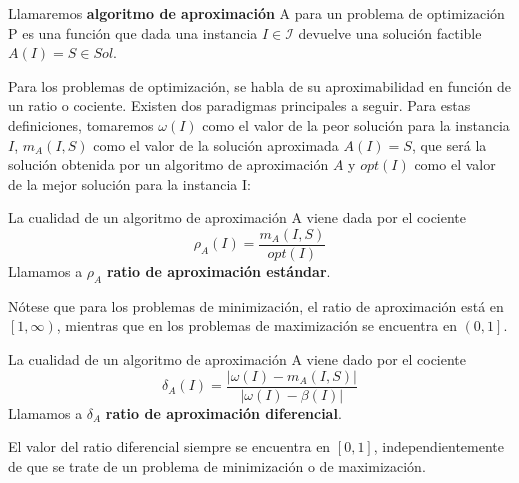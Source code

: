 \begin{definicion}
    Llamaremos \textbf{algoritmo de aproximación} A para un problema de optimización P es una función que dada una instancia $I \in \mathcal{I}$ devuelve una solución factible $A(I) = S \in Sol$. 
\end{definicion}
Para los problemas de optimización, se habla de su aproximabilidad en función de un ratio o cociente. Existen dos paradigmas principales a seguir. Para estas definiciones, tomaremos $\omega(I)$ como el valor de la peor solución para la instancia $I$, $m_{A}(I, S)$ como el valor de la solución aproximada $A(I) = S$, que será la solución obtenida por un algoritmo de aproximación $A$ y $opt(I)$ como el valor de la mejor solución para la instancia I:
\begin{definicion}
    La cualidad de un algoritmo de aproximación A viene dada por el cociente $$\rho_{A}(I)=\dfrac{m_{A}(I, S)}{opt(I)}$$
    Llamamos a $\rho_{A}$ \textbf{ratio de aproximación estándar}.
\end{definicion}
\begin{observacion}
    Nótese que para los problemas de minimización, el ratio de aproximación está en $\left[1, \infty\right)$, mientras que en los problemas de maximización se encuentra en $\left(0, 1\right]$.
\end{observacion}
\begin{definicion}
La cualidad de un algoritmo de aproximación A viene dado por el cociente $$\delta_{A}(I)=\dfrac{|\omega(I) - m_{A}(I, S)|}{|\omega(I) - \beta(I)|}$$ 
Llamamos a $\delta_{A}$ \textbf{ratio de aproximación diferencial}.
\end{definicion}
\begin{observacion}
    El valor del ratio diferencial siempre se encuentra en $\left[0,1\right]$, independientemente de que se trate de un problema de minimización o de maximización.
\end{observacion}


